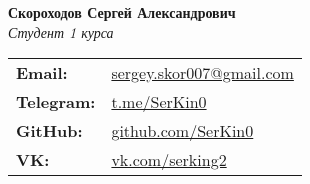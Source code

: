 \thispagestyle{empty}
\begin{center}
	\vspace*{\fill}

	\begin{tcolorbox}[
		width=0.7\textwidth,
		colback=white,
		colframe=black!50,
		arc=4mm,
		boxrule=1pt,
		enhanced jigsaw
		]
		\centering
		{\LARGE \textbf{Скороходов Сергей Александрович}} \\[0.5cm]
		{\large \textit{Студент 1 курса}} \\[1cm]

		\begin{tabular}{ll}
			\textbf{Email:} & \href{mailto:sergey.skor007@gmail.com}{sergey.skor007@gmail.com} \\
			\textbf{Telegram:} & \href{https://t.me/SerKin0}{t.me/SerKin0} \\
			\textbf{GitHub:} & \href{https://github.com/SerKin0}{github.com/SerKin0} \\
			\textbf{VK:} & \href{https://vk.com/serking2}{vk.com/serking2}
		\end{tabular}
	\end{tcolorbox}

	\vspace*{\fill}
\end{center}
